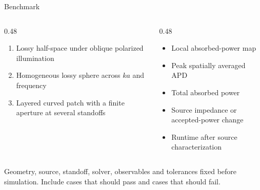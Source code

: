 \documentclass[aspectratio=169,10pt]{beamer}
\begin{document}
\begin{frame}{Benchmark}
  \vspace{2pt}
  \begin{columns}[T]
    \begin{column}{0.48\textwidth}
      \begin{questionbox}
        \begin{enumerate}\small\setlength\itemsep{5pt}
          \item Lossy half-space under oblique polarized illumination
          \item Homogeneous lossy sphere across $ka$ and frequency
          \item Layered curved patch with a finite aperture at several standoffs
        \end{enumerate}
      \end{questionbox}
    \end{column}
    \begin{column}{0.48\textwidth}
      \pause
      \begin{questionbox}
        \begin{itemize}\footnotesize\setlength\itemsep{3pt}
          \item Local absorbed-power map
          \item Peak spatially averaged APD
          \item Total absorbed power
          \item Source impedance or accepted-power change
          \item Runtime after source characterization
        \end{itemize}
      \end{questionbox}
    \end{column}
  \end{columns}
  \vspace{3pt}
  \pause
  \begin{resultbox}
    \centering\small
    Geometry, source, standoff, solver, observables and tolerances fixed before simulation. Include cases that should pass and cases that should fail.
  \end{resultbox}
  \vspace{2pt}
\end{frame}
\end{document}
